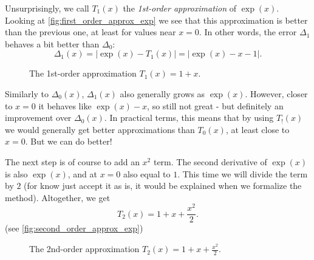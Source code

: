 Unsurprisingly, we call $T_{1}(x)$ the \emph{1st-order approximation} of $\exp(x)$. Looking at \autoref{fig:first_order_approx_exp} we see that this approximation is better than the previous one, at least for values near $x=0$. In other words, the error $\Delta_{1}$ behaves a bit better than $\Delta_{0}$:
\begin{equation}
  \Delta_{1}(x) = \lvert \exp(x) - T_{1}(x) \rvert = \lvert \exp(x)-x-1 \rvert.
  \label{eq:exp_err_1}
\end{equation}

\begin{figure}
  \centering
  \caption{The 1st-order approximation $T_{1}(x)=1+x$.}
  \label{fig:first_order_approx_exp}
\end{figure}

Similarly to $\Delta_{0}(x)$, $\Delta_{1}(x)$ also generally grows as $\exp(x)$. However, closer to $x=0$ it behaves like $\exp(x)-x$, so still not great - but definitely an improvement over $\Delta_{0}(x)$. In practical terms, this means that by using $T_{!}(x)$ we would generally get better approximations than $T_{0}(x)$, at least close to $x=0$. But we can do better!

The next step is of course to add an $x^{2}$ term. The second derivative of $\exp(x)$ is also $\exp(x)$, and at $x=0$ also equal to $1$. This time we will divide the term by $2$ (for know just accept it as is, it would be explained when we formalize the method). Altogether, we get
\begin{equation}
  T_{2}(x) = 1 + x + \frac{x^{2}}{2}.
  \label{eq:second_order_approx_exp}
\end{equation}
(see \autoref{fig:second_order_approx_exp})

\begin{figure}
  \centering
  \caption{The 2nd-order approximation $T_{2}(x)=1+x+\frac{x^{2}}{2}$.}
  \label{fig:second_order_approx_exp}
\end{figure}

